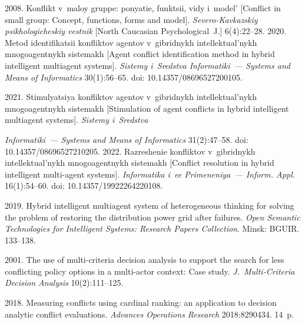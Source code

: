 \begin{multicols}{2}
{{\begin{thebibliography}{99}
    2008. Konflikt v~ma\-loy grup\-pe: po\-nya\-tie, funk\-tsii, vi\-dy i~mo\-del' [Conflict in 
small group: Concept, functions, forms and model]. \textit{Severo-Kavkazskiy psikhologicheskiy vestnik} 
[North Caucasian Psychological~J.] 6(4):22--28.
    2020. Metod iden\-ti\-fi\-ka\-tsii konf\-lik\-tov agen\-tov v~gib\-rid\-nykh 
in\-tel\-lek\-tu\-al'\-nykh mno\-go\-agent\-nykh sis\-te\-makh [Agent conflict identification
   method in hybrid intelligent multiagent systems]. \textit{Sis\-te\-my i~Sredstva Informatiki~--- Systems 
and Means of Informatics} 30(1):56--65. doi: 10.14357/08696527200105.
   
    2021. Stimulyatsiya konfliktov agentov v~gibridnykh 
intellektual'nykh mnogoagentnykh sis\-te\-makh [Stimulation of agent conflicts in hybrid intelligent 
multiagent systems]. \textit{Sis\-te\-my i~Sredstva}\linebreak\vspace*{-12pt}

\pagebreak

\noindent
\textit{Informatiki~--- Systems and Means of Informatics} 
31(2):47--58.
   doi: 10.14357/08696527210205.
   2022. Razreshenie konfliktov v~gibridnykh intellektual'nykh 
mnogoagentnykh sis\-te\-makh [Conflict resolution in hybrid intelligent multi-agent systems]. 
\textit{Informatika i~ee Primeneniya~--- Inform. Appl.} 16(1):54--60. doi: 10.14357/19922264220108.
   
    2019. Hybrid intelligent multiagent system of 
heterogeneous thinking for solving the problem of restoring the distribution power grid after failures. 
\textit{Open Semantic Technologies for Intelligent Systems: Research Papers Collection}. Minsk: BGUIR. 
133--138.
  
    2001. The use of multi-criteria decision analysis to support the search for less 
conflicting policy options in a multi-actor context: Case study. \textit{J.~Multi-Criteria Decision Analysis} 
10(2):111--125.

    2018. Measuring conflicts using 
cardinal ranking: an application to decision analytic conflict evaluations. \textit{Advances Operations 
Research} 2018:8290434. 14~p.


\end{thebibliography}}}
\end{multicols}

